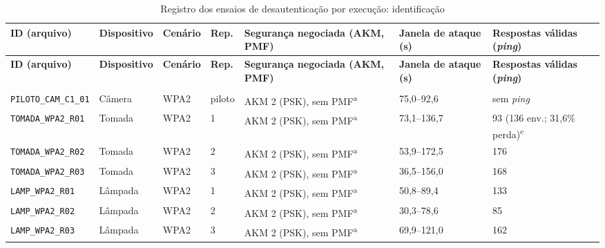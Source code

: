 
\begingroup
\footnotesize
\setlength{\tabcolsep}{2.5pt}
\renewcommand{\arraystretch}{1.1}
\begin{longtable}{|L{2.6cm}|L{2.1cm}|L{1.6cm}|L{0.9cm}|L{2.8cm}|L{1.9cm}|L{2.6cm}|}
\caption{Registro dos ensaios de desautenticação por execução: identificação}
\label{tab:registro-execucoes}\\
\hline
\textbf{ID (arquivo)} & \textbf{Dispositivo} & \textbf{Cenário} & \textbf{Rep.} & \textbf{Segurança negociada (AKM, PMF)} & \textbf{Janela de ataque (s)} & \textbf{Respostas válidas (\textit{ping})} \\ \hline
\endfirsthead
\textbf{ID (arquivo)} & \textbf{Dispositivo} & \textbf{Cenário} & \textbf{Rep.} & \textbf{Segurança negociada (AKM, PMF)} & \textbf{Janela de ataque (s)} & \textbf{Respostas válidas (\textit{ping})} \\ \hline
\endhead
\hline
\endfoot
\hline
\endlastfoot
{} \\ \hline
\texttt{PILOTO\_\allowbreak{}CAM\_\allowbreak{}C1\_\allowbreak{}01} & Câmera & WPA2 & piloto & AKM 2 (PSK), sem PMF\textsuperscript{a} & 75,0--92,6 & sem \textit{ping} \\ \hline
\texttt{TOMADA\_\allowbreak{}WPA2\_\allowbreak{}R01} & Tomada & WPA2 & 1 & AKM 2 (PSK), sem PMF\textsuperscript{a} & 73,1--136,7 & 93 (136 env.; 31,6\% perda)\textsuperscript{c} \\ \hline
\texttt{TOMADA\_\allowbreak{}WPA2\_\allowbreak{}R02} & Tomada & WPA2 & 2 & AKM 2 (PSK), sem PMF\textsuperscript{a} & 53,9--172,5 & 176 \\ \hline
\texttt{TOMADA\_\allowbreak{}WPA2\_\allowbreak{}R03} & Tomada & WPA2 & 3 & AKM 2 (PSK), sem PMF\textsuperscript{a} & 36,5--156,0 & 168 \\ \hline
\texttt{LAMP\_\allowbreak{}WPA2\_\allowbreak{}R01} & Lâmpada & WPA2 & 1 & AKM 2 (PSK), sem PMF\textsuperscript{a} & 50,8--89,4 & 133 \\ \hline
\texttt{LAMP\_\allowbreak{}WPA2\_\allowbreak{}R02} & Lâmpada & WPA2 & 2 & AKM 2 (PSK), sem PMF\textsuperscript{a} & 30,3--78,6 & 85 \\ \hline
\texttt{LAMP\_\allowbreak{}WPA2\_\allowbreak{}R03} & Lâmpada & WPA2 & 3 & AKM 2 (PSK), sem PMF\textsuperscript{a} & 69,9--121,0 & 162 \\ \hline

\end{longtable}
